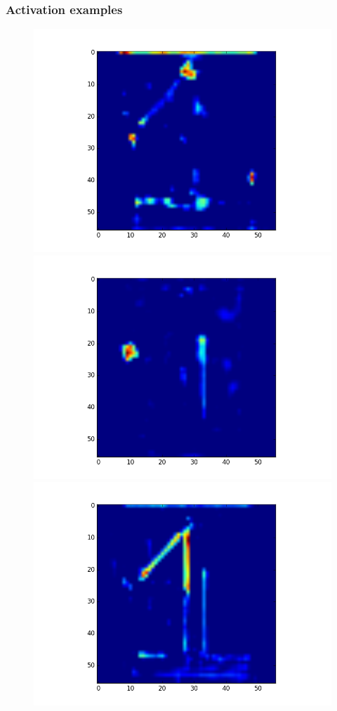 \documentclass{beamer}
\begin{document}
\begin{frame}
\frametitle{Activation examples}

\begin{figure}
  \includegraphics[width=\linewidth]{activation1.png}
\endminipage\hfill
{}
  \includegraphics[width=\linewidth]{activation2.png}
\endminipage\hfill
{}%
  \includegraphics[width=\linewidth]{activation3.png}

\end{figure}
\end{frame}
\end{document}
